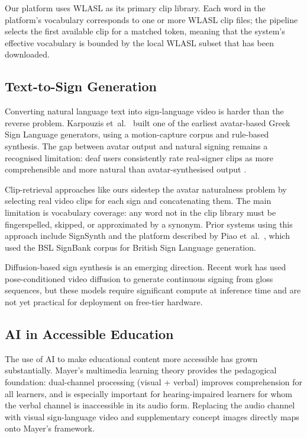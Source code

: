 \documentclass[12pt,a4paper,oneside]{report}
\begin{document}
Our platform uses WLASL as its primary clip library. Each word in the platform's vocabulary corresponds to one or more WLASL clip files; the pipeline selects the first available clip for a matched token, meaning that the system's effective vocabulary is bounded by the local WLASL subset that has been downloaded.

\subsection{Text-to-Sign Generation}

Converting natural language text into sign-language video is harder than the reverse problem. Karpouzis et~al.\ \cite{karpouzis2007avatar} built one of the earliest avatar-based Greek Sign Language generators, using a motion-capture corpus and rule-based synthesis. The gap between avatar output and natural signing remains a recognised limitation: deaf users consistently rate real-signer clips as more comprehensible and more natural than avatar-synthesised output \cite{bragg2019sign}.

Clip-retrieval approaches like ours sidestep the avatar naturalness problem by selecting real video clips for each sign and concatenating them. The main limitation is vocabulary coverage: any word not in the clip library must be fingerspelled, skipped, or approximated by a synonym. Prior systems using this approach include SignSynth \cite{efthimiou2004signsynth} and the platform described by Piao et~al.\ \cite{piao2020sign}, which used the BSL SignBank corpus for British Sign Language generation.

Diffusion-based sign synthesis is an emerging direction. Recent work has used pose-conditioned video diffusion to generate continuous signing from gloss sequences, but these models require significant compute at inference time and are not yet practical for deployment on free-tier hardware.

\subsection{AI in Accessible Education}

The use of AI to make educational content more accessible has grown substantially. Mayer's multimedia learning theory \cite{mayer2009multimedia} provides the pedagogical foundation: dual-channel processing (visual + verbal) improves comprehension for all learners, and is especially important for hearing-impaired learners for whom the verbal channel is inaccessible in its audio form. Replacing the audio channel with visual sign-language video and supplementary concept images directly maps onto Mayer's framework.
\end{document}
